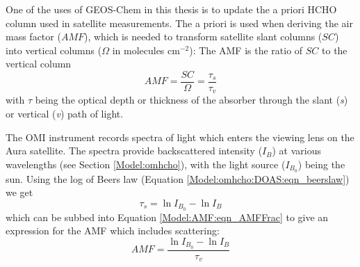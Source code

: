   One of the uses of GEOS-Chem in this thesis is to update the a priori HCHO column used in satellite measurements.
  The a priori is used when deriving the air mass factor ($AMF$), which is needed to transform satellite slant columns ($SC$) into vertical columns ($\Omega$ in molecules cm$^{-2}$):
  The AMF is the ratio of $SC$ to the vertical column
  \begin{equation} \label{Model:AMF:eqn_AMFFrac}
    AMF=\frac{SC}{\Omega} = \frac{\tau_s}{\tau_v}
  \end{equation}
  with $\tau$ being the optical depth or thickness of the absorber through the slant (\textit{s}) or vertical (\textit{v}) path of light.
  
  
  The OMI instrument records spectra of light which enters the viewing lens on the Aura satellite.
  The spectra provide backscattered intensity ($I_B$) at various wavelengths (see Section \ref{Model:omhcho}), with the light source ($I_{B_0}$) being the sun. 
  Using the log of Beers law (Equation \ref{Model:omhcho:DOAS:eqn_beerslaw}) we get 
  $$ \tau_s = \ln{I_{B_0}} - \ln{I_B} $$
  which can be subbed into Equation \ref{Model:AMF:eqn_AMFFrac} to give an expression for the AMF which includes scattering:
  \begin{equation} \label{Model:AMF:eqn_amfscattering}
    AMF = \frac{\ln{I_{B_0}}-\ln{I_B}}{\tau_v}
  \end{equation}
  
